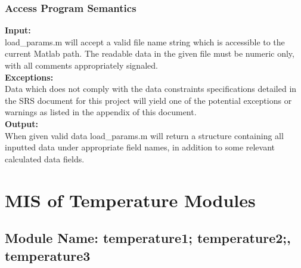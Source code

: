 \documentclass[12pt]{article}
\begin{document}

\subsubsection{Access Program Semantics}

\noindent \textbf{Input:}\\
load\_{params.m} will accept a valid file name string which is accessible to the current Matlab path.
The readable data in the given file must be numeric only, with all comments 
appropriately signaled.\\

\noindent \textbf{Exceptions:}\\
Data which does not comply with the data constraints specifications detailed in
the SRS document for this project will yield one of the potential exceptions or
warnings as listed in the appendix of this document.\\  

\noindent \textbf{Output:}\\
When given valid data load\_{params.m} will return a structure containing all
inputted data under appropriate field names, in addition to some relevant 
calculated data fields.


\section{MIS of Temperature Modules}

\subsection{Module Name: temperature1; temperature2;, temperature3}



\end{document}
